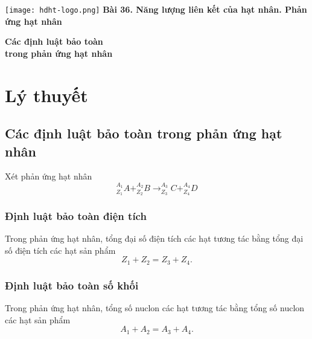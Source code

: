\newcommand{\chapter}[2][]{
	\newcommand{\chapname}{#2}
	\begin{flushleft}
		\begin{minipage}[t]{\linewidth}
			\texttt{[image: hdht-logo.png]}
			\hspace{0pt}	
			\sffamily\bfseries\large Bài  36. Năng lượng liên kết của hạt nhân. Phản ứng hạt nhân
			\begin{flushleft}
				\huge\bfseries #1
			\end{flushleft}
		\end{minipage}
	\end{flushleft}
	\vspace{1cm}
	\normalfont\normalsize
}
\chapter[Các định luật bảo toàn\\ trong phản ứng hạt nhân]{Các định luật bảo toàn trong phản ứng hạt nhân}
\section{Lý thuyết}

\subsection{Các định luật bảo toàn trong phản ứng hạt nhân}
	Xét phản ứng hạt nhân
	\begin{equation}
	^{A_1}_{Z_1}A + ^{A_2}_{Z_2}B \rightarrow ^{A_3}_{Z_3}C + ^{A_4}_{Z_4}D
	\end{equation}
	\subsubsection{Định luật bảo toàn điện tích}
	Trong phản ứng hạt nhân, tổng đại số điện tích các hạt tương tác bằng tổng đại số điện tích các hạt sản phẩm
	\begin{equation}
	Z_1+Z_2=Z_3+Z_4.
	\end{equation}
	\subsubsection{Định luật bảo toàn số khối}
	Trong phản ứng hạt nhân, tổng số nuclon các hạt tương tác bằng tổng số nuclon các hạt sản phẩm
	\begin{equation}
	A_1+A_2=A_3+A_4.
	\end{equation}
	
